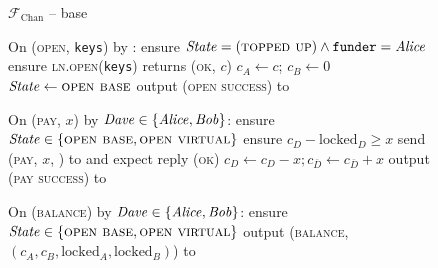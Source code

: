 \begin{figure}[H]
  \begin{systembox}{$\mathcal{F}_{\mathrm{Chan}}$ -- base}
    \begin{algorithmic}[1]
      \State On (\textsc{open}, \texttt{keys}) by \alice:
      \Indent
        \State ensure $\mathit{State} = (\textsc{topped up}) \wedge
        \mathtt{funder} = \mathit{Alice}$
        \State ensure \textsc{ln.open}(\texttt{keys}) returns (\textsc{ok}, $c$)
        \State $c_A \gets c$; $c_B \gets 0$
        \State $\mathit{State} \gets \textsc{open base}$
        \State output (\textsc{open success}) to \alice
      \EndIndent
      \Statex

      \State On (\textsc{pay}, $x$) by $\mathit{Dave} \in \{\mathit{Alice}, \mathit{Bob}\}$:
      \Indent
        \State ensure $\mathit{State} \in \{\textsc{open base}, \textsc{open
        virtual}\}$
        \State ensure $c_D - \mathrm{locked}_D \geq x$
        \State send (\textsc{pay}, $x$, \dave) to \adversary and expect reply
        (\textsc{ok}) 
        \State $c_D \gets c_D - x; c_{\bar{D}} \gets c_{\bar{D}} + x$
        \State output (\textsc{pay success}) to \dave
      \EndIndent
      \Statex

      \State On (\textsc{balance}) by $\mathit{Dave} \in \{\mathit{Alice}, \mathit{Bob}\}$:
      \Indent
        \State ensure $\mathit{State} \in \{\textsc{open base}, \textsc{open
        virtual}\}$
        \State output (\textsc{balance}, $(c_A, c_B, \mathrm{locked}_A,
        \mathrm{locked}_B)$) to \dave %
      \EndIndent
    \end{algorithmic}
  \end{systembox}
  \caption{}
  \label{code:functionality:chan:skeleton:base}
\end{figure}

